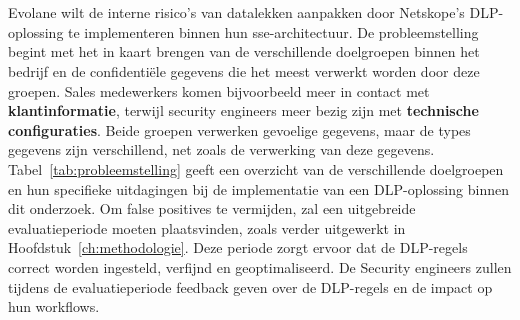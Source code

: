 \section{}%
\label{sec:probleemstelling}


% 
Evolane wilt de interne risico's van datalekken aanpakken door Netskope's DLP-oplossing te implementeren binnen hun \gls{sse}-architectuur.
De probleemstelling begint met het in kaart brengen van de verschillende doelgroepen binnen het bedrijf en de confidentiële gegevens die het meest verwerkt worden door deze groepen.
Sales medewerkers komen bijvoorbeeld meer in contact met \textbf{klantinformatie}, terwijl security engineers meer bezig zijn met \textbf{technische configuraties}.
Beide groepen verwerken gevoelige gegevens, maar de types gegevens zijn verschillend, net zoals de verwerking van deze gegevens.
Tabel~\ref{tab:probleemstelling} geeft een overzicht van de verschillende doelgroepen en hun specifieke uitdagingen bij de implementatie van een DLP-oplossing binnen dit onderzoek.
Om false positives te vermijden, zal een uitgebreide evaluatieperiode moeten plaatsvinden, zoals verder uitgewerkt in Hoofdstuk~\ref{ch:methodologie}.
Deze periode zorgt ervoor dat de DLP-regels correct worden ingesteld, verfijnd en geoptimaliseerd.
De Security engineers zullen tijdens de evaluatieperiode feedback geven over de DLP-regels en de impact op hun workflows.

